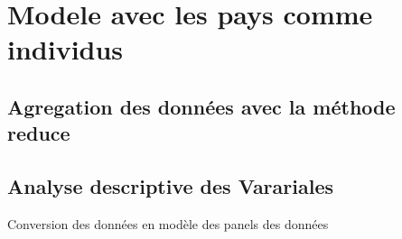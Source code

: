 \documentclass[
]{book}
\begin{document}
\hypertarget{modele-avec-les-pays-comme-individus}{%
\section{Modele avec les pays comme individus}\label{modele-avec-les-pays-comme-individus}}

\hypertarget{agregation-des-donnuxe9es-avec-la-muxe9thode-reduce}{%
\subsection{Agregation des données avec la méthode reduce}\label{agregation-des-donnuxe9es-avec-la-muxe9thode-reduce}}

\hypertarget{analyse-descriptive-des-varariales}{%
\subsection{Analyse descriptive des Varariales}\label{analyse-descriptive-des-varariales}}

Conversion des données en modèle des panels des données
\end{document}
